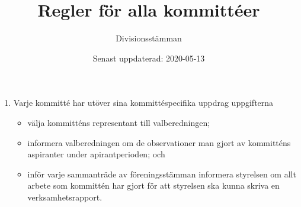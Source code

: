 \documentclass{dvd}
\begin{document}
	\title{Regler för alla kommittéer}
	\author{Divisionsstämman}
	\date{Senast uppdaterad: 2020-05-13}

	\begin{enumerate}[label=\arabic* §, ref=\arabic*]
		\item Varje kommitté har utöver sina kommittéspecifika uppdrag uppgifterna

		\begin{itemize}
			\item välja kommitténs representant till valberedningen;

			\item informera valberedningen om de observationer man gjort av kommitténs aspiranter under apirantperioden; och

			\item inför varje sammanträde av föreningsstämman informera styrelsen om allt arbete som kommittén har gjort för att styrelsen ska kunna skriva en verksamhetsrapport.
		\end{itemize}
	\end{enumerate}
\end{document}
